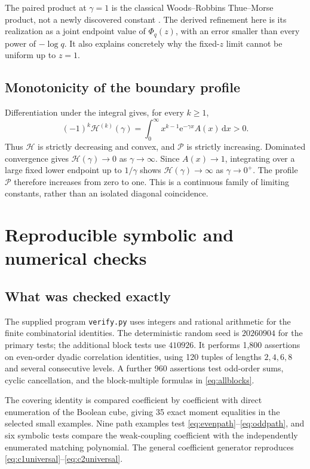 \documentclass[11pt,oneside]{article}
\numberwithin{equation}{section}
\theoremstyle{definition}
\theoremstyle{remark}
\newcommand{\dd}{\,\mathrm d}
\newcommand{\e}{\mathrm e}
\begin{document}
The paired product at \(\gamma=1\) is the classical Woods--Robbins
Thue--Morse product, not a newly discovered constant \cite{ars,ubiquitous}.
The derived refinement here is its realization as a joint endpoint value of
\(\Phi_q(z)\), with an error smaller than every power of \(-\log q\).
It also explains concretely why the fixed-\(z\) limit cannot be uniform up
to \(z=1\).

\subsection{Monotonicity of the boundary profile}
Differentiation under the integral gives, for every \(k\ge1\),
\begin{equation}
 (-1)^k\mathcal H^{(k)}(\gamma)
       =\int_0^\infty x^{k-1}\e^{-\gamma x}A(x)\dd x>0.
 \label{eq:Hderivatives}
\end{equation}
Thus \(\mathcal H\) is strictly decreasing and convex, and
\(\mathcal P\) is strictly increasing. Dominated convergence gives
\(\mathcal H(\gamma)\to0\) as \(\gamma\to\infty\).
Since \(A(x)\to1\), integrating over a large fixed lower endpoint up to
\(1/\gamma\) shows \(\mathcal H(\gamma)\to\infty\) as \(\gamma\to0^+\).
The profile \(\mathcal P\) therefore increases from zero to one. This is a
continuous family of limiting constants, rather than an isolated diagonal
coincidence.

\section{Reproducible symbolic and numerical checks}
\label{sec:experiments}

\subsection{What was checked exactly}
The supplied program \texttt{verify.py} uses integers and rational arithmetic
for the finite combinatorial identities. The deterministic random seed is
\(20260904\) for the primary tests; the additional block tests use
\(410926\). It performs 1,800 assertions on even-order dyadic correlation
identities, using 120 tuples of lengths \(2,4,6,8\) and several consecutive
levels. A further 960 assertions test odd-order sums, cyclic cancellation, and
the block-multiple formulas in \eqref{eq:allblocks}.

The covering identity is compared coefficient by coefficient with direct
enumeration of the Boolean cube, giving 35 exact moment equalities in the
selected small examples. Nine path examples test
\eqref{eq:evenpath}--\eqref{eq:oddpath}, and six symbolic tests compare the
weak-coupling coefficient with the independently enumerated matching
polynomial. The general coefficient generator reproduces
\eqref{eq:c1universal}--\eqref{eq:c2universal}.
\end{document}
